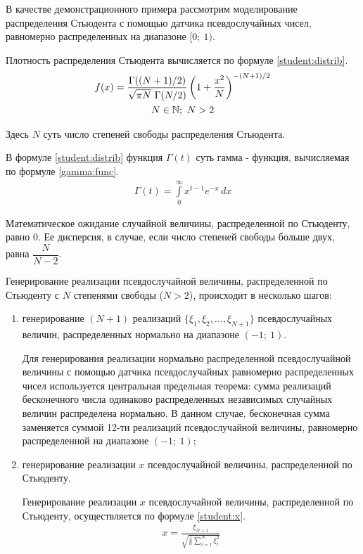 
В качестве демонстрационного примера рассмотрим моделирование распределения Стьюдента с помощью датчика псевдослучайных чисел, равномерно распределенных на диапазоне $[0 ;~ 1)$.

Плотность распределения Стьюдента вычисляется по формуле \eqref{student:distrib}.
\begin{gather}
	f(x) = \frac{\Gamma((N + 1) / 2)}{\sqrt{\pi N} ~ \Gamma(N / 2)} \left( 1 + \frac{x^2}{N} \right) ^{- (N + 1) / 2} \label{student:distrib} \\
	N \in \mathbb{N} ;~ N > 2 \notag 
\end{gather}

Здесь $N$ суть число степеней свободы распределения Стьюдента. 

В формуле \eqref{student:distrib} функция $\Gamma(t)$ суть гамма - функция, вычисляемая по формуле \eqref{gamma:func}.
\begin{gather}
	\Gamma(t) = \int \limits_0^{\infty} x^{t - 1} e^{-x} \, dx \label{gamma:func}
\end{gather}

Математическое ожидание случайной величины, распределенной по Стьюденту, равно 0. Ее дисперсия, в случае, если число степеней свободы больше двух, равна $\dfrac{N}{N - 2}$.

Генерирование реализации псевдослучайной величины, распределенной по Стьюденту с $N$ степенями свободы ($N > 2$), происходит в несколько шагов:

\begin{enumerate}

	\item генерирование $(N + 1)$ реализаций $\{\xi_1, \xi_2, ..., \xi_{N + 1}\}$ псевдослучайных величин, распределенных нормально на диапазоне $(-1 ;~ 1)$.

	Для генерирования реализации нормально распределенной псевдослучайной величины с помощью датчика псевдослучайных равномерно распределенных чисел используется центральная предельная теорема: сумма реализаций бесконечного числа одинаково распределенных независимых случайных величин распределена нормально. В данном случае, бесконечная сумма заменяется суммой 12-ти реализаций псевдослучайной величины, равномерно распределенной на диапазоне $(-1 ;~ 1)$;
	
	\item генерирование реализации $x$ псевдослучайной величины, распределенной по Стьюденту.

	Генерирование реализации $x$ псевдослучайной величины, распределенной по Стьюденту, осуществляется по формуле \eqref{student:x}.
	\begin{gather}
		x = \frac{\xi_{N + 1}}{\sqrt{\frac{1}{n}\sum \limits_{i = 1}^N \xi_i^2}} \label{student:x}
	\end{gather}

\end{enumerate}

